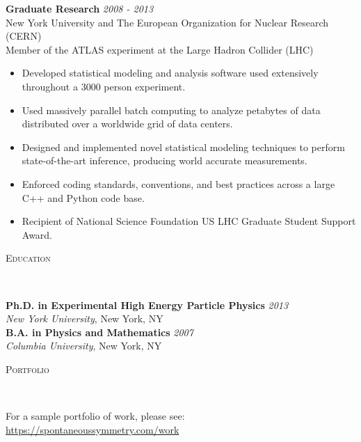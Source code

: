\documentclass[9pt]{article}
\newenvironment{changemargin}[2]{%
  \begin{list}{}{%
    \setlength{\topsep}{0pt}%
    \setlength{\leftmargin}{#1}%
    \setlength{\rightmargin}{#2}%
    \setlength{\listparindent}{\parindent}%
    \setlength{\itemindent}{\parindent}%
    \setlength{\parsep}{\parskip}%
  }%
  \item[]}{\end{list}
}
\newcommand{\lineover}{
  \begin{changemargin}{-0.05in}{-0.05in}
    \vspace*{-8pt}
    \hrulefill \\
    \vspace*{-2pt}
  \end{changemargin}
}
\newcommand{\header}[1]{
  \begin{changemargin}{-0.5in}{-0.5in}
    \scshape{#1}\\
    \lineover
  \end{changemargin}
}
\newenvironment{body} {
  \vspace*{-16pt}
\begin{changemargin}{-0.25in}{-0.5in}
  }
{\end{changemargin}
}
\begin{document}
\begin{body}
        \textbf{Graduate Research} \hfill \emph{2008 - 2013}\\
        New York University and The European Organization for Nuclear Research (CERN) \\
        Member of the ATLAS experiment at the Large Hadron Collider (LHC) \\

        \medskip

        \begin{itemize}

        \item Developed statistical modeling and analysis software used extensively throughout a 3000 person experiment.

        \item Used massively parallel batch computing to analyze petabytes of data distributed over a worldwide grid of data centers.

        \item Designed and implemented novel statistical modeling techniques to perform state-of-the-art inference, producing world accurate measurements.

        \item Enforced coding standards, conventions, and best practices across a large C++ and Python code base.

        \item Recipient of National Science Foundation US LHC Graduate Student Support Award.

        \end{itemize}

\end{body}

\smallskip

\header{Education}

\begin{body}
  \vspace{14pt}
  \textbf{Ph.D. in Experimental High Energy Particle Physics }{} \hfill \emph{2013}{} \\
  \emph{New York University}, New York, NY{} \\
  \medskip
  \textbf{B.A. in Physics and Mathematics} \hfill \emph{2007} \\
  \emph{Columbia University}, New York, NY\\
\end{body}


\header{Portfolio}

\begin{body}
  \vspace{14pt}
  For a sample portfolio of work, please see: {\url{https://spontaneoussymmetry.com/work}}
\end{body}
\end{document}

